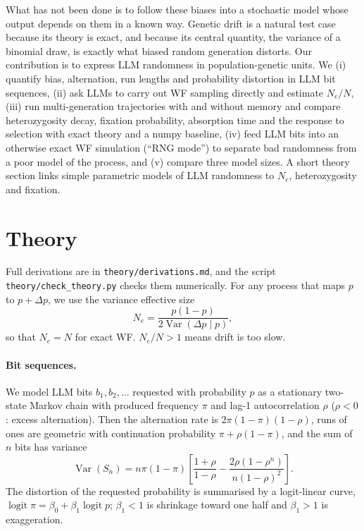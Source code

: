 \documentclass[11pt,a4paper]{article}
\newcommand{\Ne}{N_e}
\newcommand{\Var}{\operatorname{Var}}
\begin{document}
What has not been done is to follow these biases into a stochastic model whose output depends on them in a known way.
Genetic drift is a natural test case because its theory is exact, and because its central quantity, the variance of a binomial draw, is exactly what biased random generation distorts.
Our contribution is to express LLM randomness in population-genetic units.
We (i) quantify bias, alternation, run lengths and probability distortion in LLM bit sequences, (ii) ask LLMs to carry out WF sampling directly and estimate $\Ne/N$, (iii) run multi-generation trajectories with and without memory and compare heterozygosity decay, fixation probability, absorption time and the response to selection with exact theory and a numpy baseline, (iv) feed LLM bits into an otherwise exact WF simulation (``RNG mode'') to separate bad randomness from a poor model of the process, and (v) compare three model sizes.
A short theory section links simple parametric models of LLM randomness to $\Ne$, heterozygosity and fixation.

\section{Theory}
\label{sec:theory}

Full derivations are in \texttt{theory/derivations.md}, and the script \texttt{theory/check\_theory.py} checks them numerically.
For any process that maps $p$ to $p+\Delta p$, we use the variance effective size
\begin{equation}
\Ne = \frac{p(1-p)}{2\Var(\Delta p\mid p)}, \label{eq:ne}
\end{equation}
so that $\Ne=N$ for exact WF. $\Ne/N>1$ means drift is too slow.

\paragraph{Bit sequences.}
We model LLM bits $b_1,b_2,\dots$ requested with probability $p$ as a stationary two-state Markov chain with produced frequency $\pi$ and lag-1 autocorrelation $\rho$ ($\rho<0$: excess alternation).
Then the alternation rate is $2\pi(1-\pi)(1-\rho)$, runs of ones are geometric with continuation probability $\pi+\rho(1-\pi)$, and the sum of $n$ bits has variance
\begin{equation}
\Var(S_n)= n\pi(1-\pi)\left[\frac{1+\rho}{1-\rho}-\frac{2\rho(1-\rho^n)}{n(1-\rho)^2}\right]. \label{eq:markov}
\end{equation}
The distortion of the requested probability is summarised by a logit-linear curve, $\operatorname{logit}\pi=\beta_0+\beta_1\operatorname{logit}p$; $\beta_1<1$ is shrinkage toward one half and $\beta_1>1$ is exaggeration.
\end{document}
